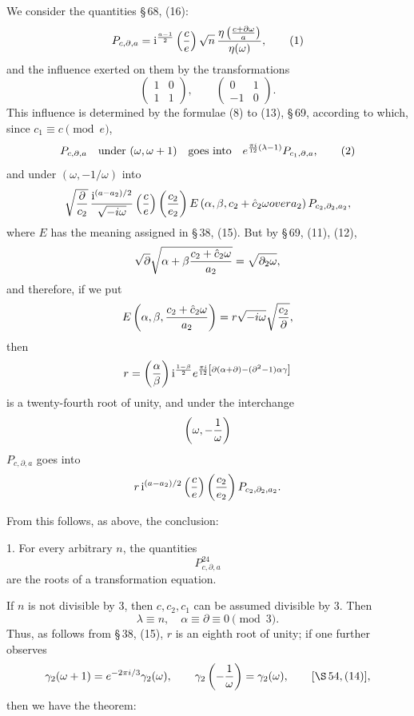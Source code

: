 \documentclass[11pt]{article}
\providecommand{\ii}{\mathrm{i}}
\begin{document}
We consider the quantities \S\,68, (16):
\begin{equation}
 P_{c,\partial,a}=\ii^{\frac{a-1}{2}}\left({c\over e}\right)
 \sqrt n\,{\eta\left({c+\partial\omega\over a}\right)\over\eta(\omega)},
\tag{1}
\end{equation}
and the influence exerted on them by the transformations
\[
 \begin{pmatrix}1&0\\1&1\end{pmatrix},
 \qquad
 \begin{pmatrix}0&1\\-1&0\end{pmatrix}.
\]
This influence is determined by the formulae (8) to (13), \S\,69, according to which, since $c_1\equiv c\pmod e$,
\begin{equation}
P_{c,\partial,a}\quad\hbox{under }(\omega,\omega+1)\quad\hbox{goes into}\quad
 e^{{\pi i\over12}(\lambda-1)}P_{c_1,\partial,a},
\tag{2}
\end{equation}
and under $\left(\omega,-1/\omega\right)$ into
\[
 \sqrt{\partial\over c_2}\,{\ii^{(a-a_2)/2}\over\sqrt{-i\omega}}
 \left({c\over e}\right)\left({c_2\over e_2}\right)
 E\left(\alpha,\beta,{c_2+\hat c_2\omega
over a_2}\right)P_{c_2,\partial_2,a_2},
\]
where $E$ has the meaning assigned in \S\,38, (15). But by \S\,69, (11), (12),
\[
 \sqrt{\partial}\sqrt{\alpha+\beta{c_2+\hat c_2\omega\over a_2}}
 =\sqrt{\partial_2\omega},
\]
and therefore, if we put
\[
 E\left(\alpha,\beta,{c_2+\hat c_2\omega\over a_2}\right)
 =r\sqrt{-i\omega}\sqrt{c_2\over\partial},
\]
then
\[
 r=\left({\alpha\over\beta}\right)
 \ii^{\frac{1-\beta}{2}}
 e^{{\pi i\over12}\left[\partial(\alpha+\partial)-(\partial^2-1)\alpha\gamma\right]}
\]
is a twenty-fourth root of unity, and under the interchange
\[
 \left(\omega,-{1\over\omega}\right)
\]
$P_{c,\partial,a}$ goes into
\[
 r\,\ii^{(a-a_2)/2}\left({c\over e}\right)
 \left({c_2\over e_2}\right)P_{c_2,\partial_2,a_2}.
\]

From this follows, as above, the conclusion:

1. For every arbitrary $n$, the quantities
\[
 P_{c,\partial,a}^{24}
\]
are the roots of a transformation equation.

If $n$ is not divisible by $3$, then $c,c_2,c_1$ can be assumed divisible by $3$. Then
\[
 \lambda\equiv n,\quad \alpha\equiv\partial\equiv0\pmod3.
\]
Thus, as follows from \S\,38, (15), $r$ is an eighth root of unity; if one further observes
\[
 \gamma_2(\omega+1)=e^{-2\pi i/3}\gamma_2(\omega),
 \qquad
 \gamma_2\left(-{1\over\omega}\right)=\gamma_2(\omega),
 \qquad [\S\,54,(14)],
\]
then we have the theorem:
\end{document}
